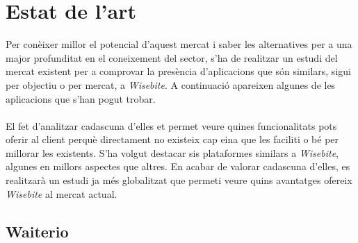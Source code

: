 
\chapter{Estat de l'art} %

\label{Chapter2} %

Per conèixer millor el potencial d'aquest mercat i saber les alternatives per a una major profunditat en el coneixement del sector, s'ha de realitzar un estudi del mercat existent per a comprovar la presència d'aplicacions que són similars, sigui per objectiu o per mercat, a \textit{Wisebite}. A continuació apareixen algunes de les aplicacions que s'han pogut trobar.
\\\\
El fet d'analitzar cadascuna d'elles et permet veure quines funcionalitats pots oferir al client perquè directament no existeix cap eina que les faciliti o bé per millorar les existents. S'ha volgut destacar sis plataformes similars a \textit{Wisebite}, algunes en millors aspectes que altres. En acabar de valorar cadascuna d'elles, es realitzarà un estudi ja més globalitzat que permeti veure quins avantatges ofereix \textit{Wisebite} al mercat actual.


\section{Waiterio}

